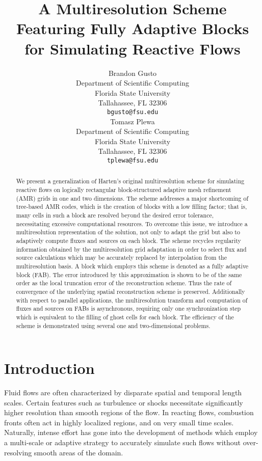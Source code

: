 \documentclass[12pt,letterpaper]{article}
\title{A Multiresolution Scheme Featuring Fully Adaptive Blocks for Simulating Reactive Flows}
\author{
  Brandon Gusto\\
  Department of Scientific Computing\\
  Florida State University\\
  Tallahassee, FL 32306 \\
  \texttt{bgusto@fsu.edu} \\
  \And
  Tomasz Plewa \\
  Department of Scientific Computing\\
  Florida State University\\
  Tallahassee, FL 32306 \\
  \texttt{tplewa@fsu.edu} \\
}
\begin{document}
\maketitle

\begin{abstract}
    We present a generalization of Harten's original multiresolution scheme for
    simulating reactive flows on logically rectangular block-structured adaptive
    mesh refinement (AMR) grids in one and two dimensions. The scheme addresses
    a major shortcoming of tree-based AMR codes, which is the creation of blocks
    with a low filling factor; that is, many cells in such a block are resolved
    beyond the desired error tolerance, necessitating excessive computational
    resources.  To overcome this issue, we introduce a multiresolution
    representation of the solution, not only to adapt the grid but also to
    adaptively compute fluxes and sources on each block. The scheme recycles
    regularity information obtained by the multiresolution grid adaptation in
    order to select flux and source calculations which may be accurately
    replaced by interpolation from the multiresolution basis. A block which
    employs this scheme is denoted as a fully adaptive block (FAB).  The error
    introduced by this approximation is shown to be of the same order as the
    local truncation error of the reconstruction scheme. Thus the rate of
    convergence of the underlying spatial reconstruction scheme is preserved.
    Additionally with respect to parallel applications, the multiresolution
    transform and computation of fluxes and sources on FABs is asynchronous,
    requiring only one synchronization step which is equivalent to the filling
    of ghost cells for each block. The efficiency of the scheme is demonstrated
    using several one and two-dimensional problems.
\end{abstract}


\section{Introduction}

    Fluid flows are often characterized by disparate spatial and temporal length
    scales. Certain features such as turbulence or shocks necessitate
    significantly higher resolution than smooth regions of the flow.  In
    reacting flows, combustion fronts often act in highly localized regions, and
    on very small time scales. Naturally, intense effort has gone into the
    development of methods which employ a multi-scale or adaptive strategy to
    accurately simulate such flows without over-resolving smooth areas of the
    domain.
\end{document}
